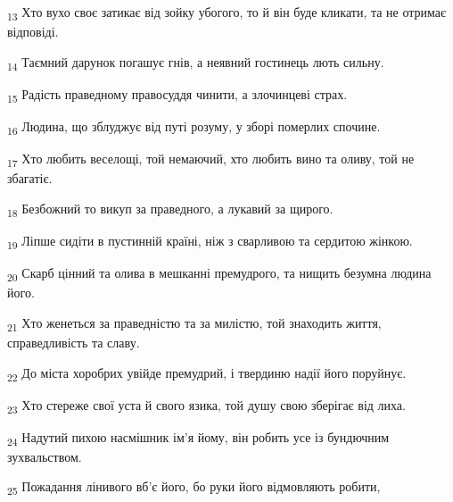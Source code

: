 \begin{tcolorbox}
\textsubscript{13} Хто вухо своє затикає від зойку убогого, то й він буде кликати, та не отримає відповіді.
\end{tcolorbox}
\begin{tcolorbox}
\textsubscript{14} Таємний дарунок погашує гнів, а неявний гостинець лють сильну.
\end{tcolorbox}
\begin{tcolorbox}
\textsubscript{15} Радість праведному правосуддя чинити, а злочинцеві страх.
\end{tcolorbox}
\begin{tcolorbox}
\textsubscript{16} Людина, що зблуджує від путі розуму, у зборі померлих спочине.
\end{tcolorbox}
\begin{tcolorbox}
\textsubscript{17} Хто любить веселощі, той немаючий, хто любить вино та оливу, той не збагатіє.
\end{tcolorbox}
\begin{tcolorbox}
\textsubscript{18} Безбожний то викуп за праведного, а лукавий за щирого.
\end{tcolorbox}
\begin{tcolorbox}
\textsubscript{19} Ліпше сидіти в пустинній країні, ніж з сварливою та сердитою жінкою.
\end{tcolorbox}
\begin{tcolorbox}
\textsubscript{20} Скарб цінний та олива в мешканні премудрого, та нищить безумна людина його.
\end{tcolorbox}
\begin{tcolorbox}
\textsubscript{21} Хто женеться за праведністю та за милістю, той знаходить життя, справедливість та славу.
\end{tcolorbox}
\begin{tcolorbox}
\textsubscript{22} До міста хоробрих увійде премудрий, і твердиню надії його поруйнує.
\end{tcolorbox}
\begin{tcolorbox}
\textsubscript{23} Хто стереже свої уста й свого язика, той душу свою зберігає від лиха.
\end{tcolorbox}
\begin{tcolorbox}
\textsubscript{24} Надутий пихою насмішник ім'я йому, він робить усе із бундючним зухвальством.
\end{tcolorbox}
\begin{tcolorbox}
\textsubscript{25} Пожадання лінивого вб'є його, бо руки його відмовляють робити,
\end{tcolorbox}
